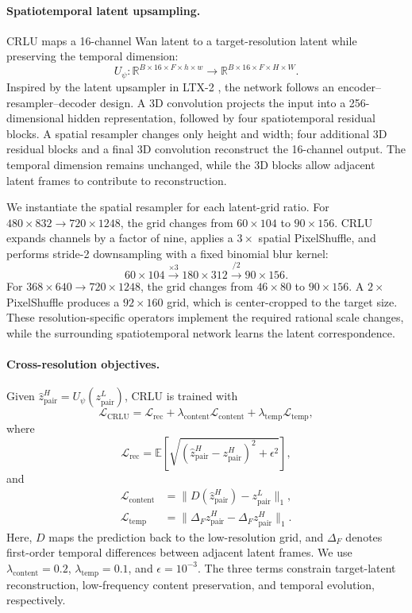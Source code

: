 \paragraph{Spatiotemporal latent upsampling.}
CRLU maps a 16-channel Wan latent to a target-resolution latent while
preserving the temporal dimension:
\[
U_\psi:
\mathbb R^{B\times16\times F\times h\times w}
\rightarrow
\mathbb R^{B\times16\times F\times H\times W}.
\]
Inspired by the latent upsampler in LTX-2
\citep{hacohen2026ltx2}, the network follows an
encoder--resampler--decoder design. A 3D convolution projects the input into a
256-dimensional hidden representation, followed by four spatiotemporal
residual blocks. A spatial resampler changes only height and width; four
additional 3D residual blocks and a final 3D convolution reconstruct the
16-channel output. The temporal dimension remains unchanged, while the 3D
blocks allow adjacent latent frames to contribute to reconstruction.

We instantiate the spatial resampler for each latent-grid ratio. For
\(480\times832\rightarrow720\times1248\), the grid changes from
\(60\times104\) to \(90\times156\). CRLU expands channels by a factor of
nine, applies a \(3\times\) spatial PixelShuffle, and performs stride-2
downsampling with a fixed binomial blur kernel:
\[
60\times104
\xrightarrow{\times3}
180\times312
\xrightarrow{/2}
90\times156.
\]
For \(368\times640\rightarrow720\times1248\), the grid changes from
\(46\times80\) to \(90\times156\). A \(2\times\) PixelShuffle produces a
\(92\times160\) grid, which is center-cropped to the target size. These
resolution-specific operators implement the required rational scale changes,
while the surrounding spatiotemporal network learns the latent correspondence.

\paragraph{Cross-resolution objectives.}
Given
\(\widehat z_{\mathrm{pair}}^H=U_\psi(z_{\mathrm{pair}}^L)\), CRLU is trained
with
\[
\mathcal L_{\mathrm{CRLU}}
=
\mathcal L_{\mathrm{rec}}
+\lambda_{\mathrm{content}}\mathcal L_{\mathrm{content}}
+\lambda_{\mathrm{temp}}\mathcal L_{\mathrm{temp}},
\]
where
\[
\mathcal L_{\mathrm{rec}}
=
\mathbb E\!\left[
\sqrt{(\widehat z_{\mathrm{pair}}^H-z_{\mathrm{pair}}^H)^2+\epsilon^2}
\right],
\]
and
\begin{align}
\mathcal L_{\mathrm{content}}
&=\lVert D(\widehat z_{\mathrm{pair}}^H)-z_{\mathrm{pair}}^L\rVert_1,\\
\mathcal L_{\mathrm{temp}}
&=\lVert\Delta_F\widehat z_{\mathrm{pair}}^H-
\Delta_Fz_{\mathrm{pair}}^H\rVert_1.
\end{align}
Here, \(D\) maps the prediction back to the low-resolution grid, and
\(\Delta_F\) denotes first-order temporal differences between adjacent latent
frames. We use \(\lambda_{\mathrm{content}}=0.2\),
\(\lambda_{\mathrm{temp}}=0.1\), and \(\epsilon=10^{-3}\). The three terms
constrain target-latent reconstruction, low-frequency content preservation,
and temporal evolution, respectively.

